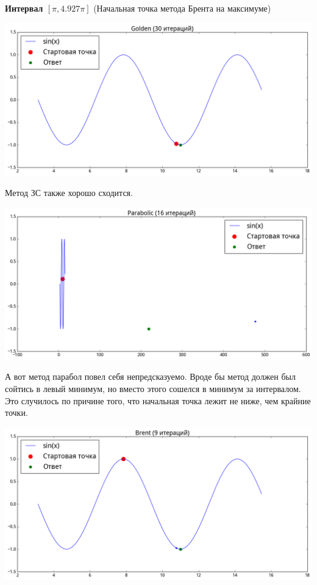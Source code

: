 \documentclass[12pt, a4paper]{article}
\begin{document}
        \textbf{Интервал $[\pi, 4.927\pi]$} (Начальная точка метода Брента на максимуме)

        \begin{center}\includegraphics[width=\picwidth, height=\picheight]{pics/sin_golden_gp.png}\end{center}

        Метод ЗС также хорошо сходится.

        \begin{center}\includegraphics[width=\picwidth, height=\picheight]{pics/sin_parabolic_gp.png}\end{center}

        А вот метод парабол повел себя непредсказуемо. Вроде бы метод должен был сойтись в левый минимум, но вместо этого сошелся в минимум за интервалом. Это случилось по причине того, что начальная точка лежит не ниже, чем крайние точки.

        \begin{center}\includegraphics[width=\picwidth, height=\picheight]{pics/sin_brent_gp.png}\end{center}
\end{document}
